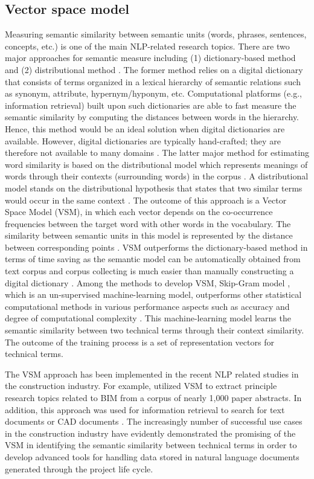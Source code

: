 \documentclass[Journal, InsideFigs, DoubleSpace]{ascelike} %
\begin{document}
\subsection{Vector space model}
%
Measuring semantic similarity between semantic units (words, phrases, sentences, concepts, etc.)  is one of the main NLP-related research topics. There are two major approaches for semantic measure including (1) dictionary-based method and (2) distributional method \cite{harispe13}.  The former method relies on a digital dictionary that consists of terms organized in a lexical hierarchy of semantic relations such as synonym, attribute, hypernym/hyponym, etc. Computational platforms (e.g., information retrieval) built upon such dictionaries are able to fast measure the semantic similarity by computing the distances between words in the hierarchy. Hence, this method would be an ideal solution when digital dictionaries are available. However, digital dictionaries are typically hand-crafted; they are therefore not available to many domains \cite{kolb08}. The latter major method for estimating word similarity is based on the distributional model which represents meanings of words through their contexts (surrounding words) in the corpus \cite{erk12}. A distributional model stands on the distributional hypothesis that states that two similar terms would occur in the same context \cite{Harris54}. The outcome of this approach is a Vector Space Model (VSM), in which each vector depends on the co-occurrence frequencies between the target word with other words in the vocabulary. The similarity between semantic units in this model is represented by the distance between corresponding points \cite{erk12}. VSM outperforms the dictionary-based method in terms of time saving as the semantic model can be automatically obtained from text corpus and corpus collecting is much easier than manually constructing a digital dictionary \cite{turney10}. Among the methods to develop VSM, Skip-Gram model \cite{mikolov13a}, which is an un-supervised machine-learning model, outperforms other statistical computational methods in various performance aspects such as accuracy and degree of computational complexity \cite{mikolov13a}. This machine-learning model learns the semantic similarity between two technical terms through their context similarity. The outcome of the training process is a set of representation vectors for technical terms. 
\par
The VSM approach has been implemented in the recent NLP related studies in the construction industry. For example, \cite{yalcinkaya15} utilized VSM to extract principle research topics related to BIM from a corpus of nearly 1,000 paper abstracts. In addition, this approach was used for information retrieval to search for text documents \cite{lv15} or CAD documents \cite{hsu13}. The increasingly number of successful use cases in the construction industry have evidently demonstrated the promising of the VSM in identifying the semantic similarity between technical terms in order to develop advanced tools for handling data stored in natural language documents generated through the project life cycle.
\par
% 
\end{document}
